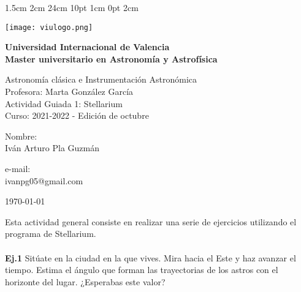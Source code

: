 \documentclass[12pt,letterpaper]{article}
\begin{document}
\setmargins{2.5cm}      
{1.5cm}                     
{2cm}  
{24cm}                    
{10pt}                          
{1cm}                          
{0pt}                             
{2cm}
\begin{titlepage}
\changefontsizes{18pt}
\texttt{[image: viulogo.png]}
\vspace{1.5cm}
\begin{center}
\begin{large}
\textbf{
Universidad Internacional de Valencia\\
\vspace{0.3cm}
Master universitario en Astronomía y Astrofísica}\\
\vspace*{1.5cm}
\begin{large}
Astronomía clásica e Instrumentación Astronómica\\
\vspace{0.5cm}
Profesora: Marta González García\\
\vspace{0.5cm}
Actividad Guiada 1: Stellarium\\
\vspace{0.5cm}
Curso: 2021-2022 - Edición de octubre\\
\end{large}
\end{large}
\vspace{5cm}
\begin{minipage}{0.60\linewidth}
Nombre:\\
Iván Arturo Pla Guzmán\\
\end{minipage}
\vspace*{-0.5cm}
\begin{minipage}{0.30\linewidth}
e-mail:\\
ivanpg05@gmail.com\\
\end{minipage}

\vspace*{0.2in}
\end{center}
\begin{flushright}
\today
\end{flushright}
\end{titlepage}
Esta actividad general consiste en realizar una serie de ejercicios utilizando el programa de Stellarium.\\\\
\textbf{Ej.1} Sitúate en la ciudad en la que vives. Mira hacia el Este y haz avanzar el tiempo. Estima el ángulo que forman las trayectorias de los astros con el horizonte del lugar. ¿Esperabas este valor?\\\\
\end{document}
